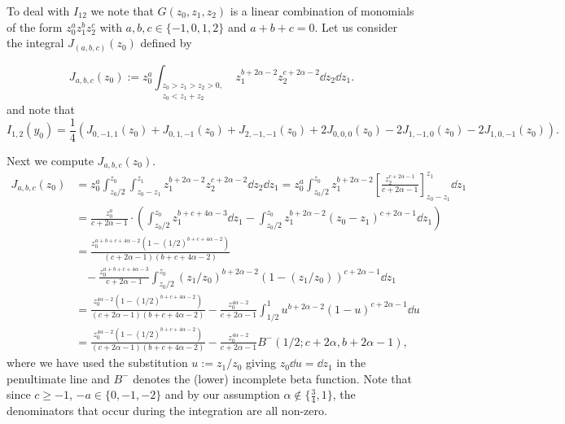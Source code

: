 To deal with $I_{12}$ we note that $G(z_0,z_1,z_2)$ is a linear combination of monomials of the form $z_0^az_1^bz_2^c$ with 
$a,b,c \in \{-1,0,1,2\}$ and $a+b+c=0$. Let us consider the integral $J_{(a,b,c)}(z_0)$ defined by 

\begin{equation}\label{eq:def_Delta_P_computation_int_J_1}
	J_{a,b,c}(z_0) := z_0^a \int_{\substack{{z_0>z_1>z_2>0,}\\{z_0 < z_1+z_2}}} z_1^{b+2\alpha-2} z_2^{c+2\alpha-2} \dd z_2\dd z_1.
\end{equation}
and note that
\begin{equation}\label{eq:Delta_P_computation_I12_with_J}
	I_{1,2}(y_0) = \frac{1}{4} (J_{0,-1,1}(z_0)+J_{0,1,-1}(z_0)+J_{2,-1,-1}(z_0)+2J_{0,0,0}(z_0)-2J_{1,-1,0}(z_0)-2J_{1,0,-1}(z_0)).
\end{equation}

Next we compute $J_{a,b,c}(z_0)$.
\begin{align*}
	J_{a,b,c}(z_0) 
	&= z_0^a \int_{z_0/2}^{z_0}\int_{z_0-z_1}^{z_1} z_1^{b+2\alpha-2} z_2^{c+2\alpha-2} \dd z_2 \dd z_1
		= z_0^a \int_{z_0/2}^{z_0} z_1^{b+2\alpha-2} \left[ \frac{ z_2^{c+2\alpha-1} }{ c+2\alpha-1 } \right]_{z_0-z_1}^{z_1} \dd z_1\\
	&= \frac{z_0^a}{c+2\alpha-1} \cdot \left( \int_{z_0/2}^{z_0} z_1^{b+c+4\alpha-3} \dd z_1
	   - \int_{z_0/2}^{z_0} z_1^{b+2\alpha-2} (z_0-z_1)^{c+2\alpha-1} \dd z_1 \right) \\
	&= \frac{z_0^{a+b+c+4\alpha-2}(1-(1/2)^{b+c+4\alpha-2})}{(c+2\alpha-1)(b+c+4\alpha-2)} \\
	&\hspace{10pt}- \frac{z_0^{a+b+c+4\alpha-3}}{c+2\alpha-1} \int_{z_0/2}^{z_0}  \left(z_1/z_0\right)^{b+2\alpha-2} 
	    \left(1-(z_1/z_0)\right)^{c+2\alpha-1} \dd z_1\\
	&= \frac{z_0^{4\alpha-2}(1-(1/2)^{b+c+4\alpha-2})}{(c+2\alpha-1)(b+c+4\alpha-2)} 
		- \frac{z_0^{4\alpha-2}}{c+2\alpha-1}
	   \int_{1/2}^1  u^{b+2\alpha-2}(1-u)^{c+2\alpha-1} \dd u \\
	&= \frac{z_0^{4\alpha-2}(1-(1/2)^{b+c+4\alpha-2})}{(c+2\alpha-1)(b+c+4\alpha-2)} 
		- \frac{z_0^{4\alpha-2}}{c+2\alpha-1} B^-(1/2;c+2\alpha, b+2\alpha-1),
\end{align*}
where we have used the substitution $u := z_1/z_0$ giving $z_0 \dd u = \dd z_1$ in the penultimate line and
$B^-$ denotes the (lower) incomplete beta function. Note that since $c \geq -1$, $-a \in \{0,-1,-2\}$ and by our assumption $\alpha \not \in \{\frac{3}{4},1\}$, the denominators that occur during the integration are all non-zero.


